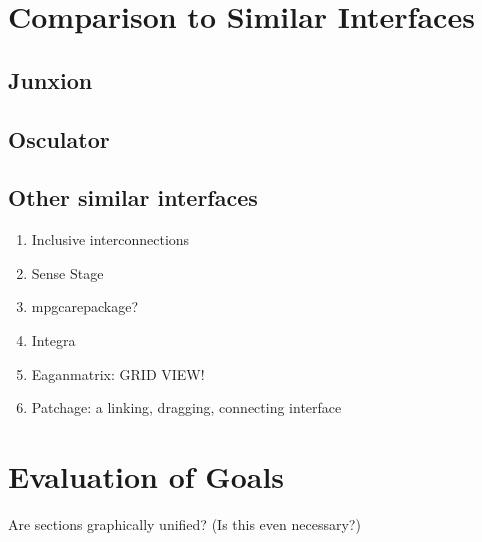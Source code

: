 

\section{Comparison to Similar Interfaces} %
\label{sec:comparison_to_similar_interfaces}

	\subsection{Junxion} %
	\label{sub:junxion}
		\cite{junxion}

	\subsection{Osculator} %
	\label{sub:osculator}
		\cite{osculator}

	\subsection{Other similar interfaces} %
	\label{sub:other_similar_interfaces}
	
	\begin{enumerate}
		\item Inclusive interconnections 
		\item Sense Stage 
		\item mpgcarepackage?
		\item Integra 
		\item Eaganmatrix: GRID VIEW! 
		\item Patchage: a linking, dragging, connecting interface 
	\end{enumerate}



\section{Evaluation of Goals} %
\label{sec:evaluation_of_goals}
	Are sections graphically unified? (Is this even necessary?)





